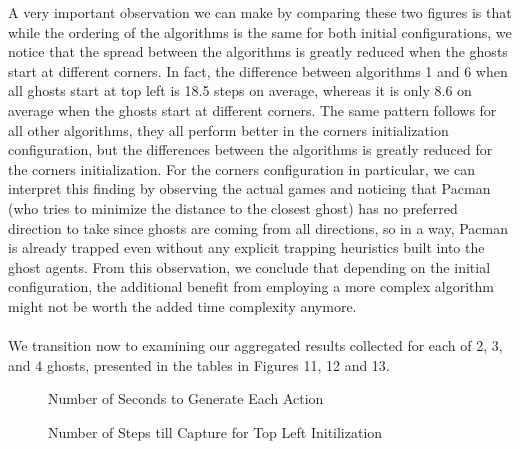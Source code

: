 \documentclass[11pt]{article}
\begin{document}
\begin{multicols}{2}
A very important observation we can make by comparing these two figures is that while the ordering of the algorithms is the same for both initial configurations, we notice that the spread between the algorithms is greatly reduced when the ghosts start at different corners. In fact, the difference between algorithms 1 and 6 when all ghosts start at top left is 18.5 steps on average, whereas it is only 8.6 on average when the ghosts start at different corners. The same pattern follows for all other algorithms, they all perform better in the corners initialization configuration, but the differences between the algorithms is greatly reduced for the corners initialization. For the corners configuration in particular, we can interpret this finding by observing the actual games and noticing that Pacman (who tries to minimize the distance to the closest ghost) has no preferred direction to take since ghosts are coming from all directions, so in a way, Pacman is already trapped even without any explicit trapping heuristics built into the ghost agents. From this observation, we conclude that depending on the initial configuration, the additional benefit from employing a more complex algorithm might not be worth the added time complexity anymore.\\\\

We transition now to examining our aggregated results collected for each of 2, 3, and 4 ghosts, presented in the tables in Figures 11, 12 and 13. 

\end{multicols}

\begin{figure}[H]
	\caption{Number of Seconds to Generate Each Action}
\end{figure}

\begin{figure}[H]
	\caption{Number of Steps till Capture for Top Left Initilization}
\end{figure}
\end{document}
